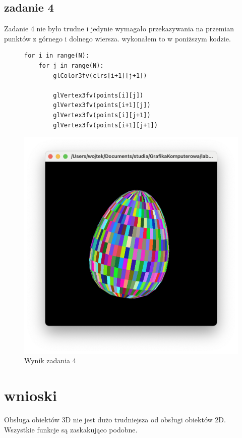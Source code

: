 \documentclass[]{article}
\begin{document}
\subsection{zadanie 4}
Zadanie 4 nie było trudne i jedynie wymagało przekazywania na przemian punktów z górnego i dolnego wiersza. wykonałem to w poniższym kodzie.
\begin{figure}
	\begin{verbatim}
for i in range(N):
	for j in range(N):
		glColor3fv(clrs[i+1][j+1])
		
		glVertex3fv(points[i][j])
		glVertex3fv(points[i+1][j])
		glVertex3fv(points[i][j+1])
		glVertex3fv(points[i+1][j+1])
	\end{verbatim}
\end{figure}
\begin{figure}[H]
	\centering
	\includegraphics[width=\textwidth]{zad4.png}
	\caption{Wynik zadania 4}
\end{figure}
\section{wnioski}
Obsługa obiektów 3D nie jest dużo trudniejsza od obsługi obiektów 2D. Wszystkie funkcje są zaskakująco podobne. 
\end{document}
